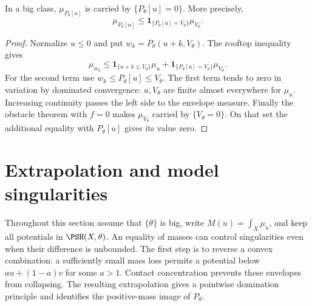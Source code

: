 \begin{proposition}\label{prop:p-envelope-contact-concentration}
In a big class, $\mu_{P_\theta[u]}$ is carried by $\{P_\theta[u]=0\}$. More precisely,
\[
 \mu_{P_\theta[u]}
       \leq\mathbf1_{\{P_\theta[u]=V_\theta\}}\mu_{V_\theta}.
\]
\end{proposition}
\begin{proof}
Normalize $u\leq0$ and put $w_k=P_\theta(u+k,V_\theta)$. The rooftop inequality gives
\[
 \mu_{w_k}\leq\mathbf1_{\{u+k\leq V_\theta\}}\mu_u
        +\mathbf1_{\{P_\theta[u]=V_\theta\}}\mu_{V_\theta}.
\]
For the second term use $w_k\leq P_\theta[u]\leq V_\theta$. The first term tends to zero in variation by dominated convergence: $u,V_\theta$ are finite almost everywhere for $\mu_u$. Increasing continuity passes the left side to the envelope measure. Finally the obstacle theorem with $f=0$ makes $\mu_{V_\theta}$ carried by $\{V_\theta=0\}$. On that set the additional equality with $P_\theta[u]$ gives its value zero.
\end{proof}

\section{Extrapolation and model singularities}
\label{sec:extrapolation-model-singularities}
Throughout this section assume that $\{\theta\}$ is big, write
$M(u)=\int_X\mu_u$, and keep all potentials in $\PSH(X,\theta)$.
An equality of masses can control singularities even when their difference is unbounded. The first step is to reverse a convex combination: a sufficiently small mass loss permits a potential below $a u+(1-a)v$ for some $a>1$. Contact concentration prevents these envelopes from collapsing. The resulting extrapolation gives a pointwise domination principle and identifies the positive-mass image of $P_\theta$.


